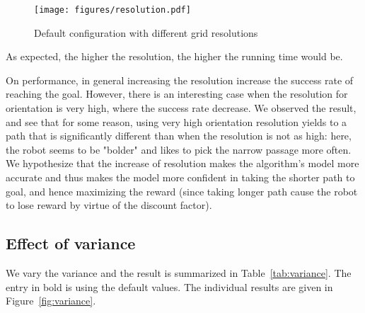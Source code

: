 \documentclass[10pt,a4paper,oneside]{article}
\begin{document}
%
%
%

\begin{figure}
\begin{center}
\texttt{[image: figures/resolution.pdf]} 
\end{center}
\caption{Default configuration with different grid resolutions}
\label{fig:resolution}
\end{figure}
As expected, the higher the resolution, the higher the running time would be.

On performance, in general increasing the resolution increase the success rate of reaching
the goal. However, there is an interesting case when the resolution
for orientation is very high, where the success rate decrease. We observed
the result, and see that for some reason, using very high orientation
resolution yields to a path that is significantly different than when the
resolution is not as high: here, the robot seems to be "bolder" and
likes to pick the narrow passage more often. We hypothesize that the increase
of resolution makes the algorithm's model more accurate and thus makes the model
more confident in taking the shorter path to goal, and hence maximizing the
reward (since taking longer path cause the robot to lose reward by virtue
of the discount factor).

\subsection{Effect of variance}

We vary the variance and the result is summarized in
Table~\ref{tab:variance}. The entry in bold is using the default values.
The individual results are given in Figure~\ref{fig:variance}.
\end{document}
